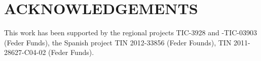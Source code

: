 \documentclass[a4paper,twoside]{article}
\begin{document}






\section*{\uppercase{Acknowledgements}}

\noindent This work has been supported by the regional projects
TIC-3928 and -TIC-03903 (Feder Funds), the Spanish project TIN
2012-33856 (Feder Founds), TIN 2011-28627-C04-02 (Feder Funds). 



{\small
}




\vfill
\end{document}
